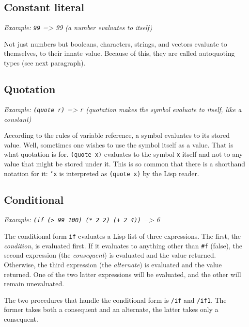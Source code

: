 \documentclass[twoside,9pt]{report}
\begin{document}
\subsection{Constant literal}
\label{constant-literal}


\emph{Example: \texttt{99} => 99 (a number evaluates to itself)}


Not just numbers but booleans, characters, strings, and vectors evaluate to themselves, to their innate value. Because of this, they are called autoquoting types (see next paragraph).

\subsection{Quotation}
\label{quotation}


\emph{Example: \texttt{(quote r)} => \texttt{r} (quotation makes the symbol evaluate to itself, like a constant)}


According to the rules of variable reference, a symbol evaluates to its stored value. Well, sometimes one wishes to use the symbol itself as a value. That is what quotation is for. \texttt{(quote x)} evaluates to the symbol \texttt{x} itself and not to any value that might be stored under it. This is so common that there is a shorthand notation for it: \texttt{'x} is interpreted as \texttt{(quote x)} by the Lisp reader.

\subsection{Conditional}
\label{conditional}


\emph{Example: \texttt{(if (> 99 100) (* 2 2) (+ 2 4))} => 6}


The conditional form \texttt{if} evaluates a Lisp list of three expressions. The first, the \emph{condition}, is evaluated first. If it evaluates to anything other than \texttt{\#f} (false), the second expression (the \emph{consequent}) is evaluated and the value returned. Otherwise, the third expression (the \emph{alternate}) is evaluated and the value returned. One of the two latter expressions will be evaluated, and the other will remain unevaluated.


The two procedures that handle the conditional form is \texttt{/if} and \texttt{/if1}. The former takes both a consequent and an alternate, the latter takes only a consequent.
\end{document}
